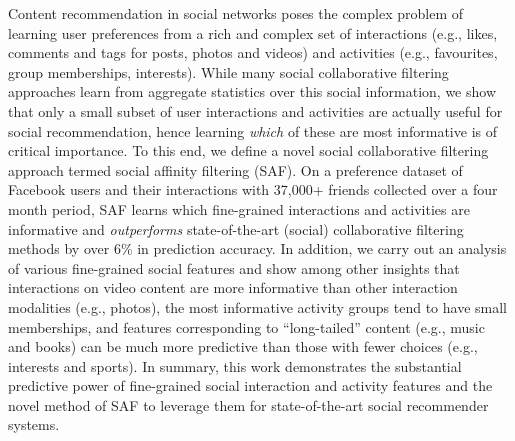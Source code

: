 %

Content recommendation in social networks poses the complex problem of
learning user preferences from a rich and complex set of interactions
(e.g., likes, comments and tags for posts, photos and videos) and
activities (e.g., favourites, group memberships, interests).  While
many social collaborative filtering approaches learn from aggregate
statistics over this social information, we show that only a small
subset of user interactions and activities are actually useful for
social recommendation, hence learning \emph{which} of these are most
informative is of critical importance.  To this end, we define a novel
social collaborative filtering approach termed social affinity
filtering (SAF).  On a preference dataset of Facebook users and their
interactions with 37,000+ friends collected over a four month period,
SAF learns which fine-grained interactions and activities are
informative and \emph{outperforms} state-of-the-art (social)
collaborative filtering methods by over 6\% in prediction accuracy.
In addition, we carry out an analysis of various fine-grained social
features and show among other insights that interactions on video
content are more informative than other interaction modalities (e.g.,
photos), the most informative activity groups tend to have small
memberships, and features corresponding to ``long-tailed'' content
(e.g., music and books) can be much more predictive than those with
fewer choices (e.g., interests and sports).
In summary, this work demonstrates the substantial predictive power of
fine-grained social interaction and activity features and the novel
method of SAF to leverage them for state-of-the-art social recommender
systems.

